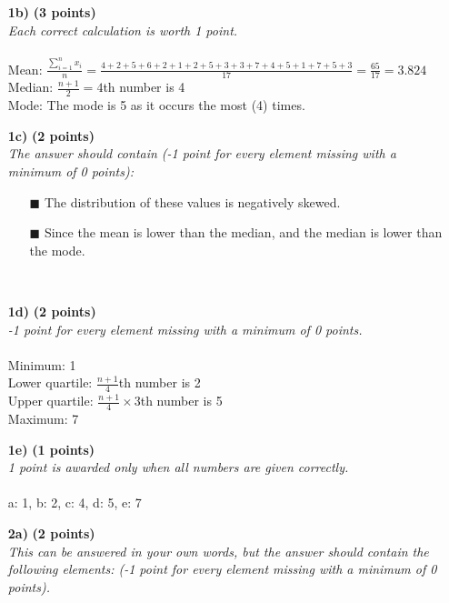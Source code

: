 \begin{itemize}
     \item[\textbf{1b)}] \textbf{(3 points)} \\
     \textit{Each correct calculation is worth 1 point.}   \\
     \\
     Mean: $\frac{\sum_{i = 1}^n x_i}{n} = \frac{4 + 2 + 5 + 6 + 2 + 1 + 2 + 5 + 3 + 3 + 7 + 4 + 5 + 1 + 7 + 5 + 3}{17} = \frac{65}{17} = 3.824$\\
     Median: $\frac{n + 1}{2} = 4$th number is 4\\
     Mode: The mode is 5 as it occurs the most (4) times. \\
     \item[\textbf{1c)}] \textbf{(2 points)} \\
     \textit{The answer should contain (-1 point for every element missing with a minimum of 0 points):}
    \begin{itemize}
    \item[$\blacksquare$] The distribution of these values is negatively skewed.        
    \item[$\blacksquare$] Since the mean is lower than the median, and the median is 
lower than the mode.
    \end{itemize} \\
     \item[\textbf{1d)}] \textbf{(2 points)} \\
     \textit{-1 point for every element missing with a minimum of 0 points.}\\
     \\
     Minimum: 1 \\
     Lower quartile: $\frac{n + 1}{4}$th number is 2\\
     Upper quartile: $\frac{n + 1}{4} \times 3$th number is 5\\
     Maximum: 7 \\
\item[\textbf{1e)}] \textbf{(1 points)} \\
     \textit{1 point is awarded only when all numbers are given correctly.} \\ \\
     a: 1, b: 2, c: 4, d: 5, e: 7 \\
\item[\textbf{2a)}] \textbf{(2 points)} \\
     \textit{This can be answered in your own words, but the answer should contain the following elements: (-1 point for every element missing with a minimum of 0 points).} \\

\end{itemize}

